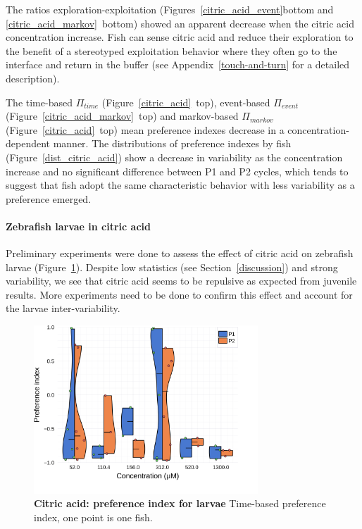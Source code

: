   The ratios exploration-exploitation (Figures~\ref{citric_acid_event}bottom and \ref{citric_acid_markov}~bottom) showed an apparent decrease when the citric acid concentration increase. Fish can sense citric acid and reduce their exploration to the benefit of a stereotyped exploitation behavior where they often go to the interface and return in the buffer (see Appendix~\ref{touch-and-turn} for a detailed description).

  The time-based $\Pi_{time}$ (Figure~\ref{citric_acid}~top), event-based $\Pi_{event}$ (Figure~\ref{citric_acid_markov}~top) and markov-based $\Pi_{markov}$ (Figure~\ref{citric_acid}~top) mean preference indexes decrease in a concentration-dependent manner. The distributions of preference indexes by fish (Figure~\ref{dist_citric_acid}) show a decrease in variability as the concentration increase and no significant difference between P1 and P2 cycles, which tends to suggest that fish adopt the same characteristic behavior with less variability as a preference emerged.

  \paragraph{Zebrafish larvae in citric acid} Preliminary experiments were done to assess the effect of citric acid on zebrafish larvae (Figure~\ref{dist_citric_acid_lar}). Despite low statistics (see Section~\ref{discussion}) and strong variability, we see that citric acid seems to be repulsive as expected from juvenile results. More experiments need to be done to confirm this effect and account for the larvae inter-variability.

    \begin{figure}[h!]
      \centering
      \includegraphics[width=0.75\textwidth]{part_2/assets/dist_citricacid_lar.png}
      \caption{\textbf{Citric acid: preference index for larvae} Time-based preference index, one point is one fish.}
      \label{dist_citric_acid_lar}
    \end{figure}

